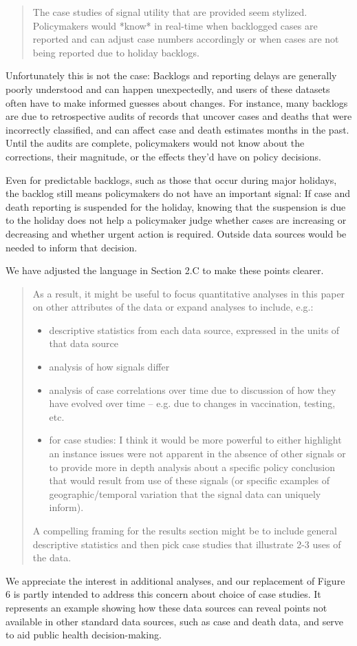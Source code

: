 \documentclass[11pt]{article}
\begin{document}
\begin{quote}
  The case studies of signal utility that are provided seem stylized.
  Policymakers would *know* in real-time when backlogged cases are reported and
  can adjust case numbers accordingly or when cases are not being reported due
  to holiday backlogs.
\end{quote}
Unfortunately this is not the case: Backlogs and reporting delays are generally
poorly understood and can happen unexpectedly, and users of these datasets often
have to make informed guesses about changes. For instance, many backlogs are due
to retrospective audits of records that uncover cases and deaths that were
incorrectly classified, and can affect case and death estimates months in the
past. Until the audits are complete, policymakers would not know about the
corrections, their magnitude, or the effects they'd have on policy decisions.

Even for predictable backlogs, such as those that occur during major holidays,
the backlog still means policymakers do not have an important signal: If case
and death reporting is suspended for the holiday, knowing that the suspension is
due to the holiday does not help a policymaker judge whether cases are
increasing or decreasing and whether urgent action is required. Outside data
sources would be needed to inform that decision.

We have adjusted the language in Section 2.C to make these points clearer.

\begin{quote}
  As a result, it might be useful to focus quantitative analyses in this paper
  on other attributes of the data or expand analyses to include, e.g.:
  \begin{itemize}
  \item descriptive statistics from each data source, expressed in the units of
    that data source
  \item analysis of how signals differ
  \item analysis of case correlations over time due to discussion of how they
    have evolved over time -- e.g. due to changes in vaccination, testing, etc.
  \item for case studies: I think it would be more powerful to either highlight
    an instance issues were not apparent in the absence of other signals or to
    provide more in depth analysis about a specific policy conclusion that would
    result from use of these signals (or specific examples of
    geographic/temporal variation that the signal data can uniquely inform).
  \end{itemize}
  A compelling framing for the results section might be to include general
  descriptive statistics and then pick case studies that illustrate 2-3 uses of
  the data.
\end{quote}
We appreciate the interest in additional analyses, and our replacement of Figure
6 is partly intended to address this concern about choice of case studies. It
represents an example showing how these data sources can reveal points not
available in other standard data sources, such as case and death data, and serve
to aid public health decision-making.
\end{document}

